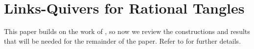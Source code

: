 \documentclass[11pt]{amsart}
\theoremstyle{plain}
\newtheorem{conjectureN}[theoremN]{Conjecture}
\theoremstyle{definition}
\newtheorem{definitionN}[theoremN]{Definition}
\theoremstyle{remark}
\begin{document}

\section{Links-Quivers for Rational Tangles}
\label{LQCTsec}

This paper builds on the work of \cite{JHpI26}, so now we review the constructions and results that will be needed for the remainder of the paper. Refer to \cite{JHpI26} for further details.
\end{document}
